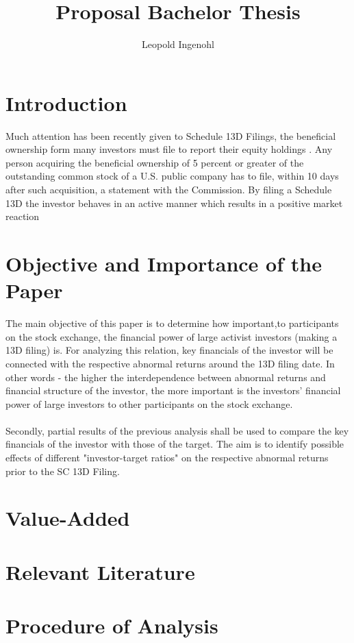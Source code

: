 \documentclass[a4paper,12pt]{article}
\title{Proposal Bachelor Thesis}
\author{Leopold Ingenohl}
\begin{document}
\maketitle

\section{Introduction}
Much attention has been recently given to Schedule 13D Filings, the beneficial ownership form many investors must file to report their equity holdings \citep{Giglia2018}. Any person acquiring the beneficial ownership of 5 percent or greater of the outstanding common stock of a U.S. public company has to file, within 10 days after such acquisition, a statement with the Commission. By filing a Schedule 13D the investor behaves in an active manner which results in a positive market reaction \citep{Brigida2012}

\section{Objective and Importance of the Paper}
The main objective of this paper is to determine how important,to participants on the stock exchange, the financial power of large activist investors (making a 13D filing) is. For analyzing this relation, key financials of the investor will be connected with the respective abnormal returns around the 13D filing date. In other words - the higher the interdependence between abnormal returns and financial structure of the investor, the more important is the investors' financial power of large investors to other participants on the stock exchange.\\
\\
Secondly, partial results of the previous analysis shall be used to compare the key financials of the investor with those of the target. The aim is to identify possible effects of different "investor-target ratios" on the respective abnormal returns prior to the SC 13D Filing. 

\section{Value-Added}

\section{Relevant Literature}

\section{Procedure of Analysis}
\end{document}
